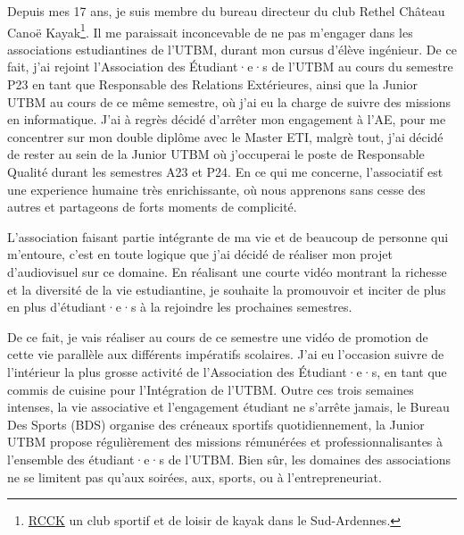 
Depuis mes 17 ans, je suis membre du bureau directeur du club Rethel Château Canoë Kayak\footnote{\href{https://rcck-ardennes.fr}{RCCK} un club sportif et de loisir de kayak dans le Sud-Ardennes.}.
Il me paraissait inconcevable de ne pas m'engager dans les associations estudiantines de l'\gls{UTBM}, durant mon cursus d'élève ingénieur.
De ce fait, j'ai rejoint l'Association des Étudiant·e·s de l'\gls{UTBM} au cours du semestre P23 en tant que Responsable des Relations Extérieures, ainsi que la Junior \gls{UTBM} au cours de ce même semestre, où j'ai eu la charge de suivre des missions en informatique.
J'ai à regrès décidé d'arrêter mon engagement à l'\gls{AE}, pour me concentrer sur mon double diplôme avec le Master ETI, malgrè tout, j'ai décidé de rester au sein de la Junior \gls{UTBM} où j'occuperai le poste de Responsable Qualité durant les semestres A23 et P24.
En ce qui me concerne, l'associatif est une experience humaine très enrichissante, où nous apprenons sans cesse des autres et partageons de forts moments de complicité.

L'association faisant partie intégrante de ma vie et de beaucoup de personne qui m'entoure, c'est en toute logique que j'ai décidé de réaliser mon projet d'audiovisuel sur ce domaine.
En réalisant une courte vidéo montrant la richesse et la diversité de la vie estudiantine, je souhaite la promouvoir et inciter de plus en plus d'étudiant·e·s à la rejoindre les prochaines semestres.

De ce fait, je vais réaliser au cours de ce semestre une vidéo de promotion de cette vie parallèle aux différents impératifs scolaires.
J'ai eu l'occasion suivre de l'intérieur la plus grosse activité de l'Association des Étudiant·e·s, en tant que commis de cuisine pour l'Intégration de l'\gls{UTBM}.
Outre ces trois semaines intenses, la vie associative et l'engagement étudiant ne s'arrête jamais, le Bureau Des Sports (BDS) organise des créneaux sportifs quotidiennement, la Junior \gls{UTBM} propose régulièrement des missions rémunérées et professionnalisantes à l'ensemble des étudiant·e·s de l'\gls{UTBM}.
Bien sûr, les domaines des associations ne se limitent pas qu'aux soirées, aux, sports, ou à l'entrepreneuriat.